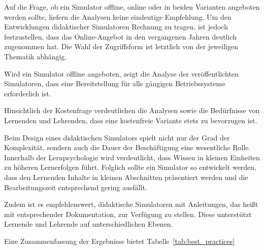 Auf die Frage, ob ein Simulator offline, online oder in beiden Varianten angeboten werden sollte, liefern die Analysen keine eindeutige Empfehlung. Um den Entwicklungen didaktischer Simulatoren Rechnung zu tragen, ist jedoch festzustellen, dass das Online-Angebot in den vergangenen Jahren deutlich zugenommen hat. Die Wahl der Zugriffsform ist letztlich von der jeweiligen Thematik abhängig.

Wird ein Simulator offline angeboten, zeigt die Analyse der veröffentlichten Simulatoren, dass eine Bereitstellung für alle gängigen Betriebssysteme erforderlich ist.

Hinsichtlich der Kostenfrage verdeutlichen die Analysen sowie die Bedürfnisse von Lernenden und Lehrenden, dass eine kostenfreie Variante stets zu bevorzugen ist.

Beim Design eines didaktischen Simulators spielt nicht nur der Grad der Komplexität, sondern auch die Dauer der Beschäftigung eine wesentliche Rolle. Innerhalb der Lernpsychologie wird verdeutlicht, dass Wissen in kleinen Einheiten zu höheren Lernerfolgen führt. Folglich sollte ein Simulator so entwickelt werden, dass den Lernenden Inhalte in kleinen Abschnitten präsentiert werden und die Bearbeitungszeit entsprechend gering ausfällt.

Zudem ist es empfehlenswert, didaktische Simulatoren mit Anleitungen, das heißt mit entsprechender Dokumentation, zur Verfügung zu stellen. Diese unterstützt Lernende und Lehrende auf unterschiedlichen Ebenen.

Eine Zusammenfassung der Ergebnisse bietet Tabelle~\ref{tab:best_practices}

